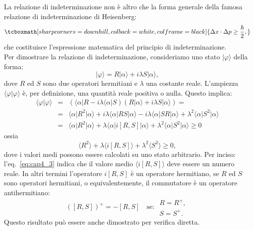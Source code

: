 La relazione di indeterminazione non è altro che la forma generale della famosa relazione di indeterminazione di Heisenberg:
	\begin{equation}
		\tcboxmath[sharp corners=downhill, colback=white, colframe=black]{
		\Delta x \cdot \Delta p \geq \frac{\hbar}{2},
		}
	\end{equation}
che costituisce l'espressione matematica del principio di indeterminazione.\\
Per dimostrare la relazione di indeterminazione, consideriamo uno stato $\vert \varphi \rangle$ della forma:
	\begin{equation}
		\vert \varphi \rangle = R\vert \alpha \rangle +i \lambda S \vert \alpha \rangle ,
	\end{equation}
dove $R$ ed $S$ sono due operatori hermitiani e $\lambda $ una costante reale. L'ampiezza $\langle \varphi \vert \varphi \rangle$ è, per definizione, una quantità reale positiva o nulla. Questo implica:
	\begin{eqnarray}
		\langle \varphi \vert \varphi \rangle &=&\left( \langle \alpha \vert R -i \lambda \langle \alpha \vert S \right) \left( R\vert \alpha \rangle +i \lambda S \vert \alpha \rangle  \right) = \nonumber \\
		&=&\langle \alpha \vert R^2 \vert \alpha \rangle + i\lambda \langle \alpha \vert RS \vert \alpha \rangle - i\lambda \langle \alpha \vert SR \vert \alpha \rangle + \lambda ^2 \langle \alpha \vert S^2 \vert \alpha \rangle \nonumber \\
		&=& \langle \alpha \vert R^2 \vert \alpha \rangle + \lambda \langle \alpha \vert i\left[ R,S\right] \vert \alpha \rangle + \lambda ^2 \langle \alpha \vert S^2 \vert \alpha \rangle \geq 0 
\end{eqnarray}
ossia
	\begin{equation}
		\label{eq:cap4_3}
		\langle  R^2  \rangle + \lambda \langle i\left[ R,S \right] \rangle + \lambda ^2 \langle S^2 \rangle \geq 0,
	\end{equation}
dove i valori medi possono essere calcolati su uno stato arbitrario. 
Per inciso: l'eq.~\eqref{eq:cap4_3} indica che il valore medio $\langle i\left[ R,S \right] \rangle$ deve essere un numero reale. In altri termini l'operatore $i\left[R,S	\right]$ è un operatore hermitiano, se $R$ ed $S$ sono operatori hermitiani, o equivalentemente, il commutatore è un operatore antihermitiano:
	\begin{equation}
		\left( \left[R,S \right] \right) ^{+} = - \left[R,S \right] \quad \textrm{se: } \begin{array}{c}
		R=R^{+},\\
		S=S^{+}.
		\end{array}
	\end{equation}
Questo risultato può essere anche dimostrato per verifica diretta.\\ 

